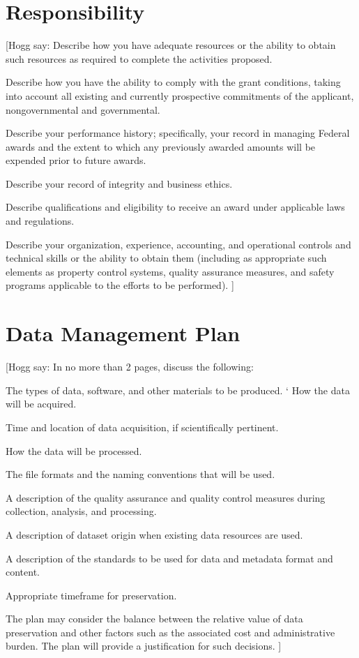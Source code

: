 \documentclass[11pt]{article}
\newcommand{\hogg}[1]{{\color{red}[Hogg say: #1 ]}}
\begin{document}
\section{Responsibility}
\hogg{Describe how you have adequate resources
or the ability to obtain such resources as
required to complete the activities proposed.

Describe how you have the ability to comply
with the grant conditions, taking into account
all existing and currently prospective
commitments of the applicant,
nongovernmental and governmental.

Describe your performance history;
specifically, your record in managing
Federal awards and the extent to which any
previously awarded amounts will be
expended prior to future awards.

Describe your record of integrity and
business ethics.

Describe qualifications and eligibility to
receive an award under applicable laws and
regulations.

Describe your organization, experience,
accounting, and operational controls and
technical skills or the ability to obtain them
(including as appropriate such elements as
property control systems, quality assurance
measures, and safety programs applicable to
the efforts to be performed).}

\section{Data Management Plan}
\hogg{In no more than 2 pages, discuss the following:

The types of data, software, and other
materials to be produced.
`
How the data will be acquired.

Time and location of data acquisition, if
scientifically pertinent.

How the data will be processed.

The file formats and the naming conventions
that will be used.

A description of the quality assurance and
quality control measures during collection,
analysis, and processing.

A description of dataset origin when existing
data resources are used.

A description of the standards to be used for
data and metadata format and content.

Appropriate timeframe for preservation.

The plan may consider the balance between
the relative value of data preservation and
other factors such as the associated cost and
administrative burden. The plan will provide
a justification for such decisions.}
\end{document}

